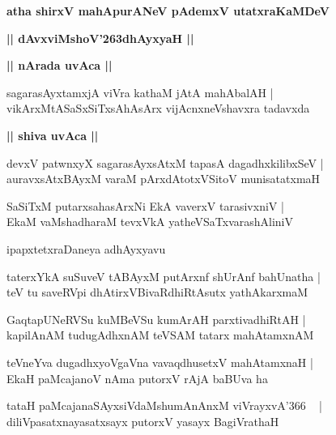 \documentclass[twoside,12pt,openright]{book}
\def\S{\char'263}
\newcounter{shloka}[chapter]
\def\uvaca#1{\centerline{{\large\textbf{#1}}}}
\begin{document}
\begin{center}
{\LARGE\bfseries atha shirxV mahApurANeV pAdemxV utatxraKaMDeV} 
\end{center}

\begin{center}
{\LARGE\bfseries  || dAvxviMshoV\S dhAyxyaH ||}
\end{center}

\uvaca{|| nArada uvAca ||}

\begin{shloka}%
sagarasAyxtamxjA viVra kathaM jAtA mahAbalAH |\\
vikArxMtASaSxSiTxsAhAsArx vijAcnxneVshavxra tadavxda
\end{shloka}

\uvaca{|| shiva uvAca ||}

\begin{shloka}%
devxV patwnxyX sagarasAyxsAtxM tapasA dagadhxkilibxSeV |\\
auravxsAtxBAyxM varaM pArxdAtotxVSitoV munisatatxmaH 
\end{shloka}

\begin{shloka}%
SaSiTxM putarxsahasArxNi EkA vaverxV tarasivxniV |\\
EkaM vaMshadharaM tevxVkA yatheVSaTxvarashAliniV 
\end{shloka}

\begin{center}
ipapxtetxraDaneya adhAyxyavu
\end{center}

\begin{shloka}%
taterxYkA suSuveV tABAyxM putArxnf shUrAnf bahUnatha |\\
teV tu saveRVpi dhAtirxVBivaRdhiRtAsutx yathAkarxmaM 
\end{shloka}

\begin{shloka}%
GaqtapUNeRVSu kuMBeVSu kumArAH parxtivadhiRtAH |\\
kapilAnAM tudugAdhxnAM teVSAM tatarx mahAtamxnAM 
\end{shloka}

\begin{shloka}%
teVneYva dugadhxyoVgaVna vavaqdhusetxV mahAtamxnaH |\\
EkaH paMcajanoV nAma putorxV rAjA baBUva ha 
\end{shloka}

\begin{shloka}%
tataH paMcajanaSAyxsiVdaMshumAnAnxM viVrayxvA\char'366 ~ |\\
diliVpasatxnayasatxsayx putorxV yasayx BagiVrathaH 
\end{shloka}
\end{document}
